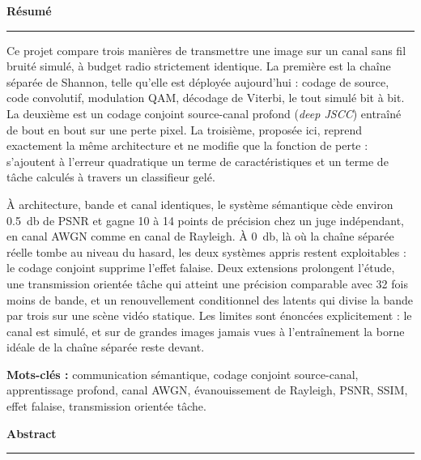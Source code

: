 \cleardoublepage
{}
{}
\vspace*{1cm}
{\LARGE\bfseries\color{insatblue} Résumé\par}\vspace{2pt}\hrule\vspace{12pt}

\noindent
Ce projet compare trois manières de transmettre une image sur un canal sans fil bruité simulé, à budget
radio strictement identique. La première est la chaîne séparée de Shannon, telle qu'elle est déployée
aujourd'hui : codage de source, code convolutif, modulation QAM, décodage de Viterbi, le tout simulé bit
à bit. La deuxième est un codage conjoint source-canal profond (\emph{deep JSCC}) entraîné de bout en bout
sur une perte pixel. La troisième, proposée ici, reprend exactement la même architecture et ne modifie que
la fonction de perte : s'ajoutent à l'erreur quadratique un terme de caractéristiques et un terme de tâche
calculés à travers un classifieur gelé.

À architecture, bande et canal identiques, le système sémantique cède environ \SI{0.5}{\decibel} de PSNR
et gagne 10 à 14 points de précision chez un juge indépendant, en canal AWGN comme en canal de Rayleigh.
À \SI{0}{\decibel}, là où la chaîne séparée réelle tombe au niveau du hasard, les deux systèmes appris
restent exploitables : le codage conjoint supprime l'effet falaise. Deux extensions prolongent l'étude,
une transmission orientée tâche qui atteint une précision comparable avec 32 fois moins de bande, et un
renouvellement conditionnel des latents qui divise la bande par trois sur une scène vidéo statique. Les
limites sont énoncées explicitement : le canal est simulé, et sur de grandes images jamais vues à
l'entraînement la borne idéale de la chaîne séparée reste devant.

\vspace{10pt}
\noindent\textbf{Mots-clés :} communication sémantique, codage conjoint source-canal, apprentissage profond,
canal AWGN, évanouissement de Rayleigh, PSNR, SSIM, effet falaise, transmission orientée tâche.

\vspace{1.4cm}
{\LARGE\bfseries\color{insatblue} Abstract\par}\vspace{2pt}\hrule\vspace{12pt}

